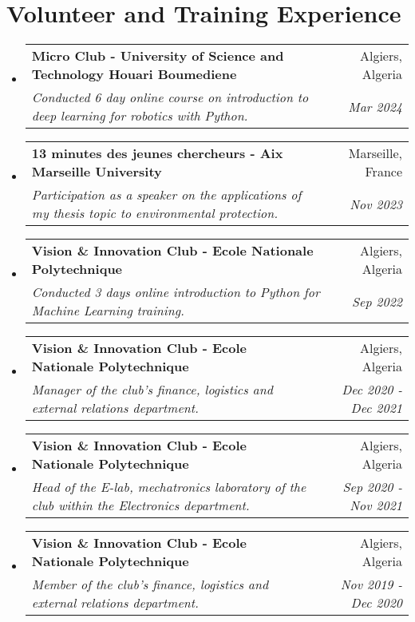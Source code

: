\documentclass[a4paper,20pt]{article}
\makeatletter
\newcommand{\resumeSubheading}[4]{
  \vspace{-1pt}\item
    \begin{tabular*}{0.97\textwidth}{l@{\extracolsep{\fill}}r}
      \textbf{#1} & #2 \\
      \textit{#3} & \textit{#4} \\
    \end{tabular*}\vspace{-5pt}
}
\newcommand{\resumeSubHeadingListStart}{\begin{itemize}[leftmargin=*]}
\newcommand{\resumeSubHeadingListEnd}{\end{itemize}}
\makeatother
\begin{document}
\vspace{-5pt}
\section{Volunteer and Training Experience}
  \resumeSubHeadingListStart
    \resumeSubheading
    {Micro Club - University of Science and Technology Houari Boumediene}{Algiers, Algeria}
    {Conducted 6 day online course on introduction to deep learning for robotics with Python.}{Mar 2024}
    \resumeSubheading
    {13 minutes des jeunes chercheurs - Aix Marseille University}{Marseille, France}
    {Participation as a speaker on the applications of my thesis topic to environmental protection.}{Nov 2023}
    \vspace{5pt}
	  \resumeSubheading
    {Vision \& Innovation Club - Ecole Nationale Polytechnique}{Algiers, Algeria}
    {Conducted 3 days online introduction to Python for Machine Learning training.}{Sep 2022}
    \vspace{5pt}
    \resumeSubheading
    {Vision \& Innovation Club - Ecole Nationale Polytechnique}{Algiers, Algeria}
    {Manager of the club's finance, logistics and external relations department.}{Dec 2020 - Dec 2021}
    \vspace{5pt}
    \resumeSubheading
    {Vision \& Innovation Club - Ecole Nationale Polytechnique}{Algiers, Algeria}
    {Head of the E-lab, mechatronics laboratory of the club within the Electronics department.}{Sep 2020 - Nov 2021}
    \vspace{5pt}
    \resumeSubheading
    {Vision \& Innovation Club - Ecole Nationale Polytechnique}{Algiers, Algeria}
    {Member of the club's finance, logistics and external relations department.}{Nov 2019 - Dec 2020}

  \resumeSubHeadingListEnd

\vspace{-5pt}
\end{document}

